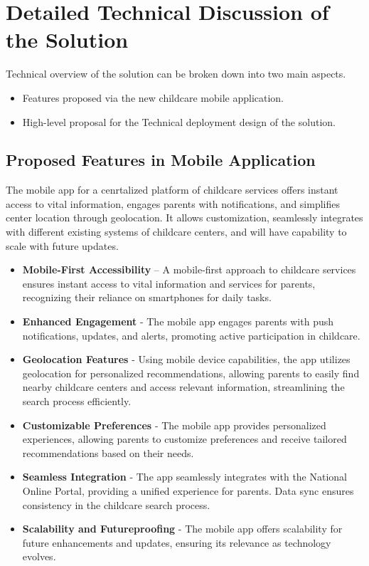 \section{Detailed Technical Discussion of the Solution}

Technical overview of the solution can be broken down into two main aspects. 

\begin{itemize}
    \item Features proposed via the new childcare mobile application. 
    \item High-level proposal for the Technical deployment design of the solution.
\end{itemize}


\subsection{Proposed Features in Mobile Application}

The mobile app for a cenrtalized platform of childcare services offers instant access to vital information, engages parents with notifications, and simplifies center location through geolocation. It allows customization, seamlessly integrates with different existing systems of childcare centers, and will have capability to scale with future updates. \par

\begin{itemize}
    \item \textbf{Mobile-First Accessibility} – A mobile-first approach to childcare services ensures instant access to vital information and services for parents, recognizing their reliance on smartphones for daily tasks.
    \item \textbf{Enhanced Engagement} - The mobile app engages parents with push notifications, updates, and alerts, promoting active participation in childcare.
    \item \textbf{Geolocation Features} - Using mobile device capabilities, the app utilizes geolocation for personalized recommendations, allowing parents to easily find nearby childcare centers and access relevant information, streamlining the search process efficiently.
    \item \textbf{Customizable Preferences} - The mobile app provides personalized experiences, allowing parents to customize preferences and receive tailored recommendations based on their needs. 
    \item \textbf{Seamless Integration} - The app seamlessly integrates with the National Online Portal, providing a unified experience for parents. Data sync ensures consistency in the childcare search process.
    \item \textbf{Scalability and Futureproofing} - The mobile app offers scalability for future enhancements and updates, ensuring its relevance as technology evolves.
\end{itemize}


